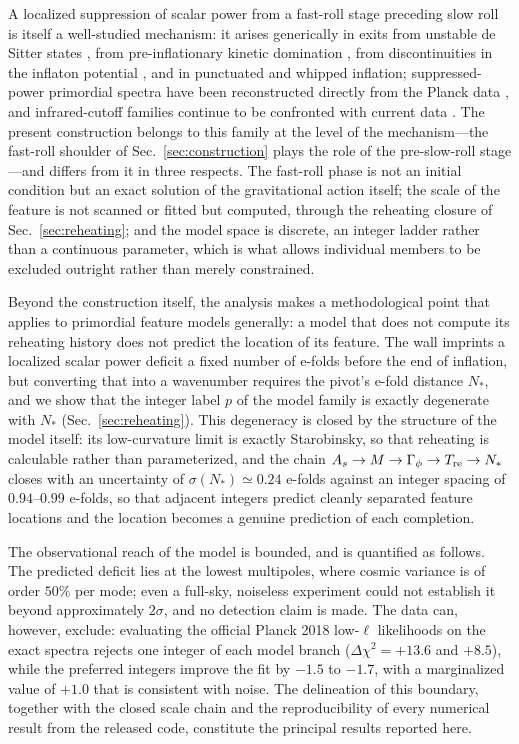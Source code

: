 \documentclass[aps,prd,twocolumn,superscriptaddress,nofootinbib,longbibliography]{revtex4-2}
\begin{document}
A localized suppression of scalar power from a fast-roll stage preceding
slow roll is itself a well-studied mechanism: it arises generically in exits
from unstable de Sitter states \cite{Linde2001}, from pre-inflationary
kinetic domination \cite{Contaldi2003,Boyanovsky2006}, from discontinuities
in the inflaton potential \cite{Starobinsky1992}, and in punctuated
\cite{Jain2009} and whipped \cite{Hazra2014,Hazra2016} inflation;
suppressed-power primordial spectra have been reconstructed directly from
the Planck data \cite{Planck2018X}, and infrared-cutoff families continue to
be confronted with current data \cite{Upadhyay2026}. The present
construction belongs to this family at the
level of the mechanism---the fast-roll shoulder of
Sec.~\ref{sec:construction} plays the role of the pre-slow-roll stage---and
differs from it in three respects. The fast-roll phase is not an initial
condition but an exact solution of the gravitational action itself; the
scale of the feature is not scanned or fitted but computed, through the
reheating closure of Sec.~\ref{sec:reheating}; and the model space is
discrete, an integer ladder rather than a continuous parameter, which is
what allows individual members to be excluded outright rather than merely
constrained.

Beyond the construction itself, the analysis makes a methodological point
that applies to primordial feature models generally: a model that does not
compute its reheating history does not predict the location of its feature.
The wall imprints a
localized scalar power deficit a fixed number of e-folds before the end of
inflation, but converting that into a wavenumber requires the pivot's e-fold
distance $N_*$, and we show that the integer label $p$ of the model family is
exactly degenerate with $N_*$ (Sec.~\ref{sec:reheating}). This degeneracy is closed by the structure of the model itself: its
low-curvature limit is exactly Starobinsky, so that reheating is calculable
rather than parameterized, and the chain
$A_s\to M\to\Gamma_\phi\to T_{\rm re}\to N_*$ closes with an uncertainty of
$\sigma(N_*)\simeq0.24$ e-folds against an integer spacing of $0.94$--$0.99$
e-folds,
so that adjacent integers predict cleanly separated feature locations and
the location becomes a genuine prediction of each completion.

The observational reach of the model is bounded, and is quantified as
follows. The predicted deficit lies at the lowest multipoles, where
cosmic variance is of order $50\%$ per mode; even a full-sky, noiseless
experiment could not establish it beyond approximately $2\sigma$, and no
detection claim is made. The data can, however, exclude: evaluating the
official Planck 2018 low-$\ell$ likelihoods on the exact spectra rejects one
integer of each model branch ($\Delta\chi^2=+13.6$ and $+8.5$), while the
preferred integers improve the fit by $-1.5$ to $-1.7$, with a marginalized
value of $+1.0$ that is consistent with noise. The delineation of this
boundary, together with the closed scale chain and the reproducibility of
every numerical result from the released code, constitute the principal results reported
here.
\end{document}
